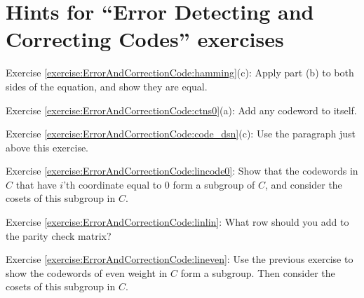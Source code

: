 \section{Hints for ``Error Detecting and Correcting Codes'' exercises}
\label{sec:ErrorAndCorrectionCode:Hints} 


Exercise \ref{exercise:ErrorAndCorrectionCode:hamming}(c): Apply part (b) to both sides of the equation, and show they are equal.


\noindent Exercise \ref{exercise:ErrorAndCorrectionCode:ctns0}(a): Add any codeword to itself.

\noindent Exercise \ref{exercise:ErrorAndCorrectionCode:code_dsn}(c): Use the  paragraph just above this exercise.

\noindent Exercise \ref{exercise:ErrorAndCorrectionCode:lincode0}: Show that the codewords in $C$ that have $i$'th coordinate equal to 0 form a subgroup of $C$, and consider the cosets of this subgroup in $C$.

\noindent Exercise \ref{exercise:ErrorAndCorrectionCode:linlin}:  What row should you add to the parity check matrix?

\noindent Exercise \ref{exercise:ErrorAndCorrectionCode:lineven}:  Use the previous exercise to show the codewords of even weight in $C$ form a subgroup. Then consider the cosets of this subgroup in $C$.

